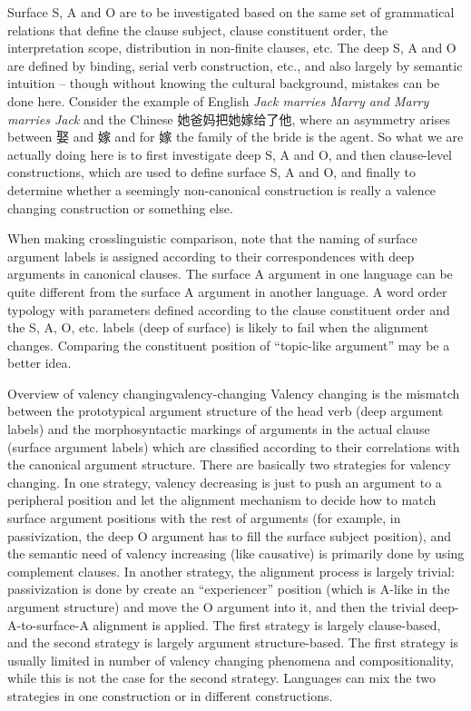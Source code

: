 \documentclass[UTF8, a4paper, oneside, scheme=plain]{ctexart}
\newcommand*{\corpus}[1]{\emph{#1}}
\begin{document}
Surface S, A and O 
are to be investigated based on the same set of grammatical relations that define 
the clause subject, clause constituent order, 
the interpretation scope, distribution in non-finite clauses, etc. 
The deep S, A and O are defined
by binding, serial verb construction, etc., 
and also largely by semantic intuition -- 
though without knowing the cultural background, mistakes can be done here.
Consider the example of English \corpus{Jack marries Marry and Marry marries Jack} 
and the Chinese 她爸妈把她嫁给了他, 
where an asymmetry arises between 娶 and 嫁 and for 嫁 the family of the bride is the agent.
So what we are actually doing here is to first investigate deep S, A and O, 
and then clause-level constructions, which are used to define surface S, A and O, 
and finally to determine whether a seemingly non-canonical construction 
is really a valence changing construction or something else.

When making crosslinguistic comparison,
note that the naming of surface argument labels is assigned 
according to their correspondences with deep arguments in canonical clauses.
The surface A argument in one language can be quite different from the surface A argument in another language.
A word order typology with parameters defined 
according to the clause constituent order 
and the S, A, O, etc. labels (deep of surface) 
is likely to fail when the alignment changes.
Comparing the constituent position of ``topic-like argument'' may be a better idea.

\begin{infobox}{Overview of valency changing}{valency-changing}
    Valency changing is the mismatch between 
    the prototypical argument structure of the head verb (deep argument labels)
    and the morphosyntactic markings of arguments in the actual clause
    (surface argument labels)
    which are classified according to their correlations with the canonical argument structure.
    There are basically two strategies for valency changing.
    In one strategy, valency decreasing is just to push an argument to a peripheral position 
    and let the alignment mechanism to decide how to match surface argument positions 
    with the rest of arguments
    (for example, in passivization, the deep O argument 
    has to fill the surface subject position),
    and the semantic need of valency increasing (like causative) 
    is primarily done by using complement clauses.
    In another strategy, the alignment process is largely trivial:
    passivization is done by create an ``experiencer'' position (which is A-like in the argument structure)
    and move the O argument into it,
    and then the trivial deep-A-to-surface-A alignment is applied. 
    The first strategy is largely clause-based,
    and the second strategy is largely argument structure-based. 
    The first strategy is usually limited in number of valency changing phenomena and compositionality,
    while this is not the case for the second strategy.
    Languages can mix the two strategies in one construction or in different constructions.
\end{infobox}
\end{document}
